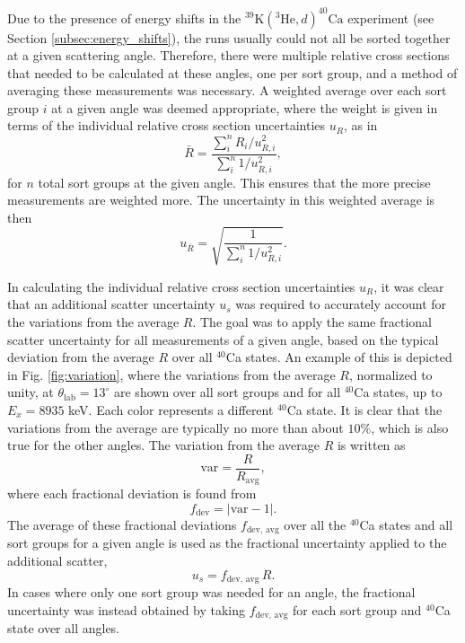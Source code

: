 Due to the presence of energy shifts in the $^{39}\mathrm{K}(^{3}\mathrm{He},d)^{40}\mathrm{Ca}$ experiment (see Section \ref{subsec:energy_shifts}), the runs usually could not all be sorted together at a given scattering angle. Therefore, there were multiple relative cross sections that needed to be calculated at these angles, one per sort group, and a method of averaging these measurements was necessary. A weighted average over each sort group $i$ at a given angle was deemed appropriate, where the weight is given in terms of the individual relative cross section uncertainties $u_{R}$, as in
\begin{equation}
\bar{R} = \frac{\sum^{n}_{i} R_{i}/u^{2}_{R, i}}{\sum^{n}_{i} 1/u^{2}_{R, i}},
\end{equation}
for $n$ total sort groups at the given angle. This ensures that the more precise measurements are weighted more. The uncertainty in this weighted average is then
\begin{equation}
u_{\bar{R}} = \sqrt{\frac{1}{\sum^{n}_{i} 1/u^{2}_{R, i}}}.
\end{equation}

In calculating the individual relative cross section uncertainties $u_{R}$, it was clear that an additional scatter uncertainty $u_{s}$ was required to accurately account for the variations from the average $R$. The goal was to apply the same fractional scatter uncertainty for all measurements of a given angle, based on the typical deviation from the average $R$ over all $^{40}$Ca states. An example of this is depicted in Fig. \ref{fig:variation}, where the variations from the average $R$, normalized to unity, at $\theta_{\mathrm{lab}} = 13^{\circ}$ are shown over all sort groups and for all $^{40}$Ca states, up to $E_{x} = 8935$ keV. Each color represents a different $^{40}$Ca state. It is clear that the variations from the average are typically no more than about $10\%$, which is also true for the other angles. The variation from the average $R$ is written as
\begin{equation}
\mathrm{var} = \frac{R}{R_{\mathrm{avg}}},
\end{equation}
where each fractional deviation is found from
\begin{equation}
f_{\mathrm{dev}} = | \mathrm{var} - 1 |.
\end{equation}
The average of these fractional deviations $f_{\mathrm{dev,\, avg}}$ over all the $^{40}$Ca states and all sort groups for a given angle is used as the fractional uncertainty applied to the additional scatter,
\begin{equation}
u_{s} = f_{\mathrm{dev,\, avg}} \, R.
\end{equation}
In cases where only one sort group was needed for an angle, the fractional uncertainty was instead obtained by taking $f_{\mathrm{dev,\, avg}}$ for each sort group and $^{40}$Ca state over all angles. 

